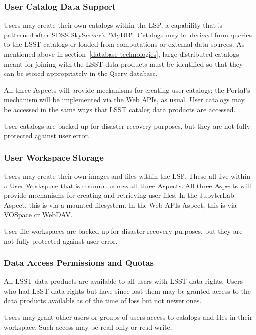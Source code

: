 \subsubsection{User Catalog Data Support}\label{user-catalog-data-support}

Users may create their own catalogs within the LSP, a capability that is
patterned after SDSS SkyServer's "MyDB".  Catalogs may be derived from queries
to the LSST catalogs or loaded from computations or external data sources.  As
mentioned above in section~\ref{database-technologies}, large distributed
catalogs meant for joining with the LSST data products must be identified so
that they can be stored appropriately in the Qserv database.

All three Aspects will provide mechanisms for creating user catalogs; the
Portal's mechanism will be implemented via the Web APIs, as usual.  User
catalogs may be accessed in the same ways that LSST catalog data products are
accessed.

User catalogs are backed up for disaster recovery purposes, but they are not
fully protected against user error.

\subsubsection{User Workspace Storage}\label{user-workspace-storage}

Users may create their own images and files within the LSP.  These all live
within a User Workspace that is common across all three Aspects.  All three
Aspects will provide mechanisms for creating and retrieving user files.  In
the JupyterLab Aspect, this is via a mounted filesystem.  In the Web APIs
Aspect, this is via VOSpace or WebDAV.

User file workspaces are backed up for disaster recovery purposes, but they are
not fully protected against user error.

\subsubsection{Data Access Permissions and Quotas}\label{data-access-permissions-and-quotas}

All LSST data products are available to all users with LSST data rights.  Users
who had LSST data rights but have since lost them may be granted access to the
data products available as of the time of loss but not newer ones.

Users may grant other users or groups of users access to catalogs and files in
their workspace.  Such access may be read-only or read-write.


